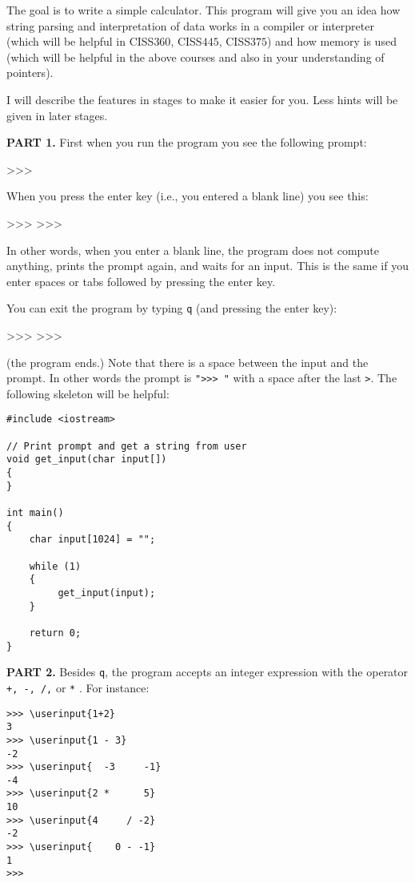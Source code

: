 The goal is to write a simple calculator. This program will give you an
idea how string parsing and interpretation of data works in a compiler or
interpreter (which will be helpful in CISS$360$, CISS$445$, CISS$375$) and
how memory is used (which will be helpful in the above courses and also in
your understanding of pointers).

I will describe the features in stages to make it easier for you. Less hints
will be given in later stages.

\textbf{PART 1.} First when you run the program you see the following prompt:
\begin{console}
>>> 
\end{console}
When you press the enter key (i.e., you entered a blank line) you see this:
\begin{console}
>>> 
>>>
\end{console}
In other words, when you enter a blank line, the program does not compute
anything, prints the prompt again, and waits for an input. This is the same
if you enter spaces or tabs followed by pressing the enter key.

You can exit the program by typing \verb!q! (and pressing the enter key):
\begin{console}[commandchars=\\\{\}]
>>> 
>>> 
\end{console}
(the program ends.) Note that there is a space between the input and the
prompt. In other words the prompt is \verb!">>> "! with a space after the
last \verb!>!. The following skeleton will be helpful:

\begin{Verbatim}[frame=single]
#include <iostream>

// Print prompt and get a string from user
void get_input(char input[])
{
}

int main()
{
    char input[1024] = "";

    while (1)
    {
         get_input(input); 
    }

    return 0;
}
\end{Verbatim}

\textbf{PART 2.} Besides \verb!q!, the program accepts an integer expression
with the operator \verb!+, -, /,! or \verb!*! . For instance:

\begin{Verbatim}[frame=single, commandchars=\\\{\}]
>>> \userinput{1+2}
3
>>> \userinput{1 - 3}
-2
>>> \userinput{  -3     -1}
-4
>>> \userinput{2 *      5}
10
>>> \userinput{4     / -2}
-2
>>> \userinput{    0 - -1}
1
>>> 
\end{Verbatim}

